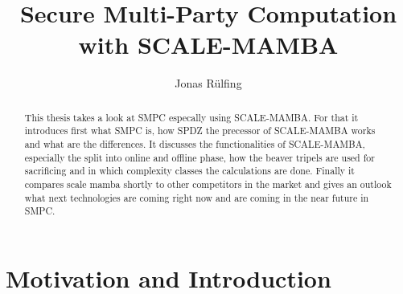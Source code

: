 \documentclass[english,runningheads,a4paper]{llncs}[2018/03/10]
\begin{document}
\title{Secure Multi-Party Computation with SCALE-MAMBA}

\author{Jonas Rülfing}

%
%

\maketitle

\begin{abstract}
  This thesis takes a look at SMPC especally using SCALE-MAMBA. For that it introduces first what SMPC is,  how SPDZ the precessor of SCALE-MAMBA works and what are the differences. It discusses the functionalities of SCALE-MAMBA, especially the split into online and offline phase, how the beaver tripels are used for sacrificing and in which complexity classes the calculations are done. Finally it compares scale mamba shortly to other competitors in the market and gives an outlook what next technologies are coming right now and are coming in the near future in SMPC.
\end{abstract}

\section{Motivation and Introduction}\label{sec:intromoti}
\end{document}
